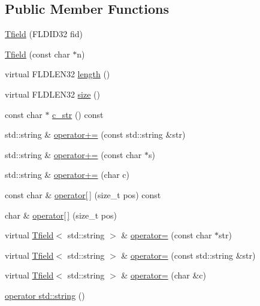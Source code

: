 \subsection*{Public Member Functions}
\begin{DoxyCompactItemize}
\item 
\hyperlink{classatmi_1_1_tfield_3_01std_1_1string_01_4_a46059c3e91ce3847b3109e4500f017f6}{Tfield} (F\+L\+D\+I\+D32 fid)
\item 
\hyperlink{classatmi_1_1_tfield_3_01std_1_1string_01_4_ac228a4c4d13e1573fd166a6506d98d87}{Tfield} (const char $\ast$n)
\item 
virtual F\+L\+D\+L\+E\+N32 \hyperlink{classatmi_1_1_tfield_3_01std_1_1string_01_4_ac4fdf6b5f9d1929b34bddc97274c6c9b}{length} ()
\item 
virtual F\+L\+D\+L\+E\+N32 \hyperlink{classatmi_1_1_tfield_3_01std_1_1string_01_4_aea88f61cd27f8f258ee473e0e938790b}{size} ()
\item 
const char $\ast$ \hyperlink{classatmi_1_1_tfield_3_01std_1_1string_01_4_a775ddd0103e3e3f0fc85dfda5df72280}{c\+\_\+str} () const 
\item 
std\+::string \& \hyperlink{classatmi_1_1_tfield_3_01std_1_1string_01_4_a0ae5aeb1f751da7fb31c4a756141ef79}{operator+=} (const std\+::string \&str)
\item 
std\+::string \& \hyperlink{classatmi_1_1_tfield_3_01std_1_1string_01_4_afc6a279456872094b29c874d140294e8}{operator+=} (const char $\ast$s)
\item 
std\+::string \& \hyperlink{classatmi_1_1_tfield_3_01std_1_1string_01_4_a3800087db4dfe0e4c5441f004f6d10c9}{operator+=} (char c)
\item 
const char \& \hyperlink{classatmi_1_1_tfield_3_01std_1_1string_01_4_aeff4f32e684575375cff733f3838d8bc}{operator\mbox{[}$\,$\mbox{]}} (size\+\_\+t pos) const 
\item 
char \& \hyperlink{classatmi_1_1_tfield_3_01std_1_1string_01_4_a21a1c27750ed6b7d61695350e222454b}{operator\mbox{[}$\,$\mbox{]}} (size\+\_\+t pos)
\item 
virtual \hyperlink{classatmi_1_1_tfield}{Tfield}$<$ std\+::string $>$ \& \hyperlink{classatmi_1_1_tfield_3_01std_1_1string_01_4_a21bd47092a2c5957cb49cd1d1dac336b}{operator=} (const char $\ast$str)
\item 
virtual \hyperlink{classatmi_1_1_tfield}{Tfield}$<$ std\+::string $>$ \& \hyperlink{classatmi_1_1_tfield_3_01std_1_1string_01_4_a913f243afaa2a73d402dd8d95966ff52}{operator=} (const std\+::string \&str)
\item 
virtual \hyperlink{classatmi_1_1_tfield}{Tfield}$<$ std\+::string $>$ \& \hyperlink{classatmi_1_1_tfield_3_01std_1_1string_01_4_a07889dbc9492c3f30512c60e8bb543a1}{operator=} (char \&c)
\item 
\hyperlink{classatmi_1_1_tfield_3_01std_1_1string_01_4_ad2ebba17c2215a4e364f762e0400545b}{operator std\+::string} ()
\end{DoxyCompactItemize}
